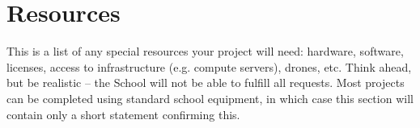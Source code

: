 \documentclass[12pt]{extarticle}
\begin{document}
\section*{Resources}

This is a list of any special resources your project will
need: hardware, software, licenses, access to
infrastructure (e.g. compute servers), drones, etc. Think
ahead, but be realistic -- the School will not be able to
fulfill all requests.
Most projects can be completed using standard school
equipment, in which case this section will contain only a
short statement confirming this.
\end{document}
